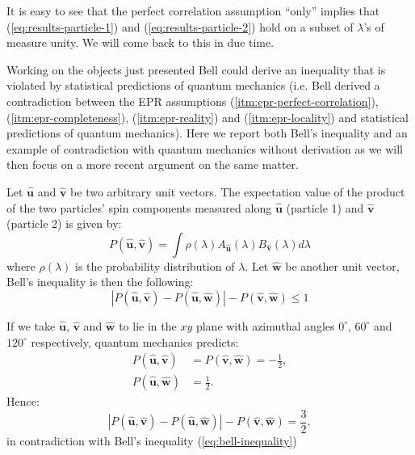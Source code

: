 \begin{remark}
  \label{rem:well-def-ab}
  It is easy to see that the perfect correlation assumption ``only'' implies that (\ref{eq:results-particle-1}) and (\ref{eq:results-particle-2}) hold on a subset of $\lambda$'s of measure unity. We will come back to this in due time.
\end{remark}

\begin{observation}
Working on the objects just presented Bell \cite{Bell1964} could derive an inequality that is violated by statistical predictions of quantum mechanics (i.e. Bell derived a contradiction between the EPR assumptions (\ref{itm:epr-perfect-correlation}), (\ref{itm:epr-completeness}), (\ref{itm:epr-reality}) and (\ref{itm:epr-locality}) and statistical predictions of quantum mechanics). Here we report both Bell's inequality and an example of contradiction with quantum mechanics without derivation as we will then focus on a more recent argument on the same matter.

Let $\mathbf{\hat{u}}$ and $\mathbf{\hat{v}}$ be two arbitrary unit vectors. The expectation value of the product of the two particles' spin components measured along $\mathbf{\hat{u}}$ (particle 1) and $\mathbf{\hat{v}}$ (particle 2) is given by:
\begin{equation*}
  P(\mathbf{\hat{u}}, \mathbf{\hat{v}}) = \int \rho(\lambda) A_{\mathbf{\hat{u}}}(\lambda) B_{\mathbf{\hat{v}}}(\lambda) d\lambda
\end{equation*}
where $\rho(\lambda)$ is the probability distribution of $\lambda$. Let $\mathbf{\hat{w}}$ be another unit vector, Bell's inequality is then the following:
\begin{equation}
  \left| P(\mathbf{\hat{u}}, \mathbf{\hat{v}}) - P(\mathbf{\hat{u}}, \mathbf{\hat{w}}) \right| - P(\mathbf{\hat{v}}, \mathbf{\hat{w}}) \leq 1
  \label{eq:bell-inequality}
\end{equation}

If we take $\mathbf{\hat{u}}$, $\mathbf{\hat{v}}$ and $\mathbf{\hat{w}}$ to lie in the $xy$ plane with azimuthal angles $0^\circ$, $60^\circ$ and $120^\circ$ respectively, quantum mechanics predicts:
\begin{equation*}
  \begin{split}
    P(\mathbf{\hat{u}}, \mathbf{\hat{v}}) &= P(\mathbf{\hat{v}}, \mathbf{\hat{w}}) = -\frac{1}{2},\\
    P(\mathbf{\hat{u}}, \mathbf{\hat{w}}) &= \frac{1}{2}.
  \end{split}
\end{equation*}
Hence:
\begin{equation*}
  \left| P(\mathbf{\hat{u}}, \mathbf{\hat{v}}) - P(\mathbf{\hat{u}}, \mathbf{\hat{w}}) \right| - P(\mathbf{\hat{v}}, \mathbf{\hat{w}}) = \frac{3}{2},
\end{equation*}
in contradiction with Bell's inequality (\ref{eq:bell-inequality})
\end{observation}


